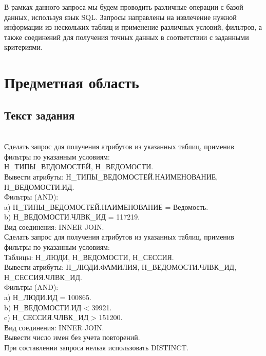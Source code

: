 \documentclass[14pt]{extreport}
\begin{document}
    \pagestyle{empty}
    
    \pagestyle{plain}
    \tableofcontents

    \intro В рамках данного запроса мы будем проводить различные операции с базой данных, используя язык SQL. Запросы направлены на извлечение нужной информации из нескольких таблиц и применение различных условий, фильтров, а также соединений для получения точных данных в соответствии с заданными критериями.

    \chapter{Предметная область}
    \section{Текст задания}\\
            Сделать запрос для получения атрибутов из указанных таблиц, применив фильтры по указанным условиям:\\
            Н\_ТИПЫ\_ВЕДОМОСТЕЙ, Н\_ВЕДОМОСТИ.\\
            Вывести атрибуты: Н\_ТИПЫ\_ВЕДОМОСТЕЙ.НАИМЕНОВАНИЕ, Н\_ВЕДОМОСТИ.ИД.\\
            Фильтры (AND):\\
            a) Н\_ТИПЫ\_ВЕДОМОСТЕЙ.НАИМЕНОВАНИЕ = Ведомость.\\
            b) Н\_ВЕДОМОСТИ.ЧЛВК\_ИД = 117219.\\
            Вид соединения: INNER JOIN.\\
            Сделать запрос для получения атрибутов из указанных таблиц, применив фильтры по указанным условиям:\\
            Таблицы: Н\_ЛЮДИ, Н\_ВЕДОМОСТИ, Н\_СЕССИЯ.\\
            Вывести атрибуты: Н\_ЛЮДИ.ФАМИЛИЯ, Н\_ВЕДОМОСТИ.ЧЛВК\_ИД, Н\_СЕССИЯ.ЧЛВК\_ИД.\\
            Фильтры (AND):\\
            a) Н\_ЛЮДИ.ИД = 100865.\\
            b) Н\_ВЕДОМОСТИ.ИД < 39921.\\
            c) Н\_СЕССИЯ.ЧЛВК\_ИД > 151200.\\
            Вид соединения: INNER JOIN.\\
            Вывести число имен без учета повторений.\\
            При составлении запроса нельзя использовать DISTINCT.\\
\end{document}
